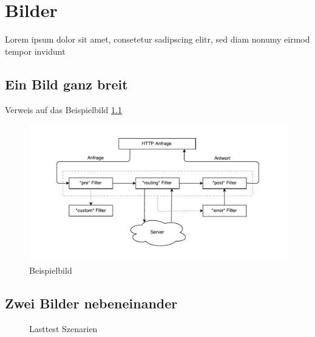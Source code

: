 
\chapter{Bilder}

Lorem ipsum dolor sit amet, consetetur sadipscing elitr, sed diam nonumy eirmod tempor invidunt 
\section{Ein Bild ganz breit} 
Verweis auf das Beispielbild \ref{fig:zuul}

\begin{figure}[htbp]
 \centering
 \includegraphics[width=\linewidth]{kapitel3/bilder/beispielbild}
 \caption{Beispielbild}
 \label{fig:zuul}
\end{figure}


\section{Zwei Bilder nebeneinander} 


\begin{figure}
\hfill
{}
\caption{Lasttest Szenarien}
\end{figure}
